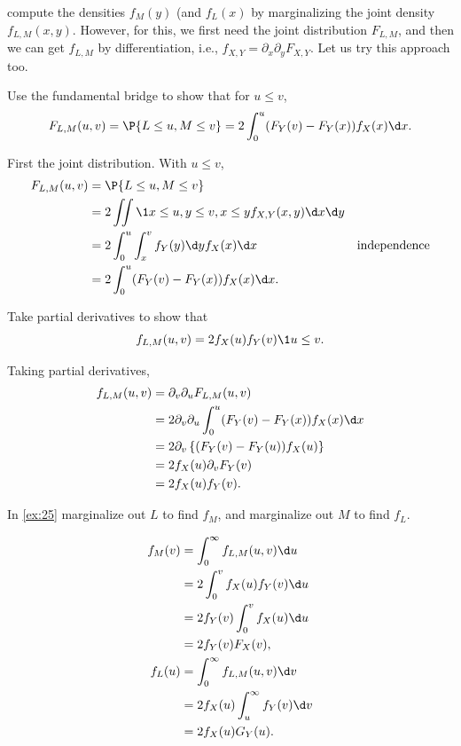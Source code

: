 \documentclass[a4paper]{article}
\begin{document}
 compute the densities \(f_{M}(y)\) (and \(f_{L}(x)\) by marginalizing the joint density \(f_{L,M}(x,y)\).
However, for this, we first need the joint distribution \(F_{L,M}\), and then we can get \(f_{L,M}\) by differentiation, i.e., \(f_{X,Y} = \partial_{x}\partial_y F_{X,Y}\). Let us try this approach too.


\begin{exercise}
Use the fundamental bridge to show that for \(u\leq v\),
\begin{equation*}
  F_{L,M}(u,v) = \P{L\leq u, M\leq v} = 2\int_0^u (F_Y(v)- F_Y(x)) f_X(x) \d x.
\end{equation*}
\begin{solution}
First the joint distribution. With \(u\leq v\),
  \begin{align*}
F_{L,M}(u,v) &= \P{L\leq u, M \leq v} \\
&= 2\iint \1{x \leq u, y\leq v, x\leq y} f_{X,Y}(x,y)\d x \d y \\
&= 2\int_0^u \int_x^v f_Y(y) \d y f_X(x) \d x & \text{independence} \\
&= 2\int_0^u (F_Y(v)- F_Y(x)) f_X(x) \d x.
  \end{align*}
\end{solution}
\end{exercise}

\begin{exercise}
Take partial derivatives to show that
\begin{equation*}
f_{L,M}(u,v) = 2f_X(u) f_Y(v)\1{u\leq v}.
\end{equation*}
\begin{solution}
Taking partial derivatives,
\begin{align*}
f_{L,M}(u,v)
&=\partial_v\partial_{u}F_{L,M}(u,v) \\
&=2 \partial_v\partial_{u} \int_0^u (F_Y(v)- F_Y(x)) f_X(x) \d x  \\
&=2 \partial_v \left\{(F_Y(v)- F_Y(u)) f_X(u) \right \}  \\
&=2 f_X(u)\partial_v F_Y(v)  \\
&=2 f_X(u)f_Y(v).
\end{align*}
\end{solution}
\label{ex:25}
\end{exercise}


\begin{exercise}
In \cref{ex:25} marginalize out \(L\) to find \(f_M\), and marginalize out \(M\) to find \(f_L\).
\begin{solution}
\begin{align*}
  f_M(v) &=  \int_0^{\infty} f_{L,M}(u,v) \d u \\
&= 2 \int_0^{v} f_{X}(u) f_Y(v) \d u \\
&= 2 f_Y(v) \int_0^{v} f_{X}(u) \d u  \\
&= 2f_Y(v) F_X(v), \\
f_L(u) &=  \int_0^{\infty} f_{L,M}(u,v) \d v \\
&= 2 f_{X}(u) \int_u^{\infty} f_Y(v) \d v \\
&= 2 f_{X}(u) G_{Y}(u).
\end{align*}
\end{solution}
\end{exercise}
\end{document}
